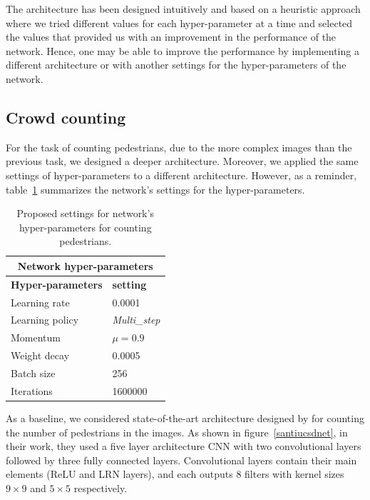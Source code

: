 The architecture has been designed intuitively and based on a heuristic approach where we tried different values for each hyper-parameter at a time and selected the values that provided us with an improvement in the performance of the network. Hence, one may be able to improve the performance by implementing a different architecture or with another settings for the hyper-parameters of the network. 

\subsection{Crowd counting}
\label{subsec:ucsdarch}

For the task of counting pedestrians, due to the more complex images than the previous task, we designed a deeper architecture. Moreover, we applied the same settings of hyper-parameters to a different architecture. However, as a reminder, table~\ref{hypar2} summarizes the network's settings for the hyper-parameters.

\begin{table}[H]
	\centering
	\begin{tabular}{ |p{3.8cm}|p{1.7cm}| }
	\hline 
	\multicolumn{2}{|c|}{\textbf{Network hyper-parameters}} \\
	\hline
	\hline
	\textbf{Hyper-parameters} & \textbf{setting }\\
	\hline
	Learning rate & 0.0001\\
	\hline
	Learning policy    & \textit{Multi\_step} \\
	\hline
	Momentum & $\mu = 0.9$\\
	\hline
	Weight decay & 0.0005 \\
	\hline
	Batch size & 256 \\
	\hline
	Iterations & 1600000 \\
	\hline
	\end{tabular}
		\caption{Proposed settings for network's hyper-parameters for counting pedestrians.}
		\label{hypar2}
\end{table} 

As a baseline, we considered state-of-the-art architecture designed by \citealt*{segui2015learning} for counting the number of pedestrians in the images. As shown in figure~\ref{santiucsdnet}, in their work, they used a five layer architecture CNN with two convolutional layers followed by three fully connected layers. Convolutional layers contain their main elements (ReLU and LRN layers), and each outputs 8 filters with kernel sizes $9\times9$ and $5\times5$ respectively. 

